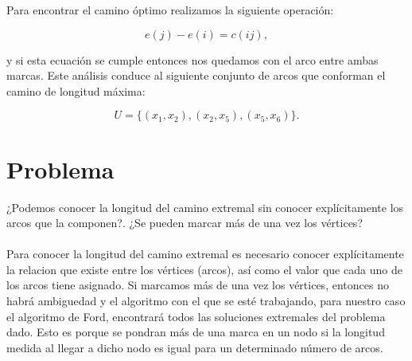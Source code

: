 \documentclass[autocontact]{gaceta}
\begin{document}
    Para encontrar el camino óptimo realizamos la siguiente operación:
    
    \begin{equation}\label{eq:p1-1}
        e(j) - e(i) = c(ij),
    \end{equation}
    
    y si esta ecuación se cumple entonces nos quedamos con el arco entre ambas marcas.
    Este análisis conduce al siguiente conjunto de arcos que conforman el camino de longitud máxima:
    
    \begin{equation}
        U = \{ (x_1, x_2), (x_2, x_5), (x_5, x_6) \}.    
    \end{equation}
    





\section{Problema}
    ¿Podemos conocer la longitud del camino extremal sin conocer explícitamente los arcos que la 
    componen?. ¿Se pueden marcar más de una vez los vértices? \\
    \\Para conocer la longitud del camino extremal es necesario conocer explícitamente
        la relacion que existe entre los vértices (arcos), así como el valor que cada uno de los arcos tiene
        asignado. Si marcamos más de una vez los vértices, entonces no habrá ambiguedad y el algoritmo con el que
        se esté trabajando, para nuestro caso el algoritmo de Ford, encontrará todos las soluciones extremales del 
        problema dado. Esto es porque se pondran más de una marca en un nodo si la longitud medida al llegar a dicho
        nodo es igual para un determinado número de arcos.





\end{document}
